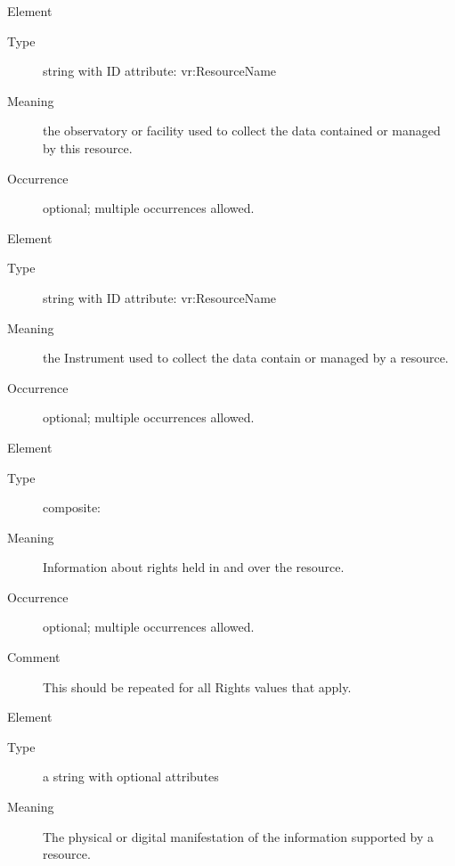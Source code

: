 \documentclass[11pt,a4paper]{ivoa}
\begin{document}
\begin{generated}
\begingroup\small\begin{bigdescription}\item[Element \xmlel{facility}]
\begin{description}
\item[Type] string with ID attribute: vr:ResourceName
\item[Meaning] 
                     the observatory or facility used to collect the data 
                     contained or managed by this resource.  
                   
\item[Occurrence] optional; multiple occurrences allowed.

\end{description}
\item[Element \xmlel{instrument}]
\begin{description}
\item[Type] string with ID attribute: vr:ResourceName
\item[Meaning] 
                     the Instrument used to collect the data contain or 
                     managed by a resource.  
                   
\item[Occurrence] optional; multiple occurrences allowed.

\end{description}
\item[Element \xmlel{rights}]
\begin{description}
\item[Type] composite: 
\item[Meaning] 
                      Information about rights held in and over the resource.
                    
\item[Occurrence] optional; multiple occurrences allowed.
\item[Comment] 
                      This should be repeated for all Rights values that apply.
                    

\end{description}
\item[Element \xmlel{format}]
\begin{description}
\item[Type] a string with optional attributes
\item[Meaning] 
                      The physical or digital manifestation of the information 
                      supported by a resource.
                    

\end{description}
\end{bigdescription}
\end{generated}
\end{document}
